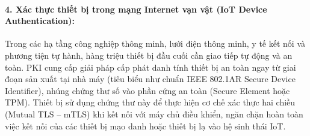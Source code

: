 \paragraph{4. Xác thực thiết bị trong mạng Internet vạn vật (IoT Device Authentication):}
Trong các hạ tầng công nghiệp thông minh, lưới điện thông minh, y tế kết nối và phương tiện tự hành, hàng triệu thiết bị đầu cuối cần giao tiếp tự động và an toàn. PKI cung cấp giải pháp cấp phát danh tính thiết bị an toàn ngay từ giai đoạn sản xuất tại nhà máy (tiêu biểu như chuẩn IEEE 802.1AR Secure Device Identifier), nhúng chứng thư số vào phần cứng an toàn (Secure Element hoặc TPM). Thiết bị sử dụng chứng thư này để thực hiện cơ chế xác thực hai chiều (Mutual TLS -- mTLS) khi kết nối với máy chủ điều khiển, ngăn chặn hoàn toàn việc kết nối của các thiết bị mạo danh hoặc thiết bị lạ vào hệ sinh thái IoT.

